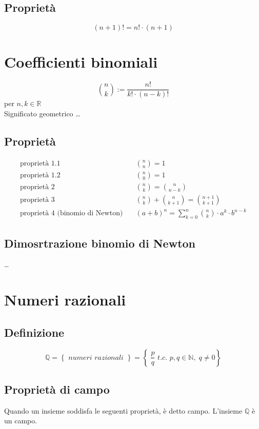 \documentclass[a4paper]{article}
\begin{document}
\subsection{Proprietà}
\[(n + 1)! = n! \cdot (n + 1)\]

\section{Coefficienti binomiali}
\[\binom{n}{k} := \frac{n!}{k! \cdot (n - k)!}\]
per \(n, k \in \mathbb{R}\) \\
Significato geometrico \dots

\subsection{Proprietà}
\begin{align*}
	\text{proprietà 1.1} \quad & \binom{n}{n} = 1 \\
	\text{proprietà 1.2} \quad & \binom{n}{0} = 1 \\
	\text{proprietà 2} \quad & \binom{n}{k} = \binom{n}{n-k} \\
	\text{proprietà 3} \quad & \binom{n}{k} + \binom{n}{k+1} = \binom{n+1}{k+1} \\
	\text{proprietà 4 (binomio di Newton)} \quad & (a + b) ^ n = \sum_{k = 0} ^ {n} \binom{n}{k} \cdot a ^ k \cdot b ^ {n - k}
\end{align*}

\subsection{Dimosrtrazione binomio di Newton}
\dots

\newpage

\section{Numeri razionali}
\subsection{Definizione}
\[\mathbb{Q} = \left\{ \textit{ numeri razionali } \right\} = \left\{ \; \frac{p}{q} \textit{ t.c. } p,q \in \mathbb{N}, \; q \neq 0 \right\}\]

\subsection{Proprietà di campo}
Quando un insieme soddisfa le seguenti proprietà, è detto campo. L'insieme \(\mathbb{Q}\) è un campo.
\end{document}
